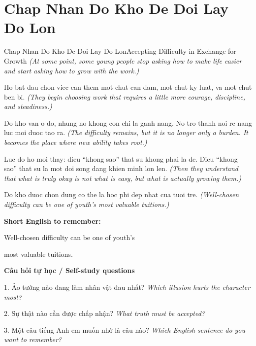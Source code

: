 \section{Chap Nhan Do Kho De Doi Lay Do Lon}
\begin{truyen}{Chap Nhan Do Kho De Doi Lay Do Lon}{Accepting Difficulty in Exchange for Growth}
\textit{(At some point, some young people stop asking how to make life easier and start asking how to grow with the work.)}

Ho bat dau chon viec can them mot chut can dam, mot chut ky luat, va mot chut ben bi.
\textit{(They begin choosing work that requires a little more courage, discipline, and steadiness.)}

Do kho van o do, nhung no khong con chi la ganh nang. No tro thanh noi re nang luc moi duoc tao ra.
\textit{(The difficulty remains, but it is no longer only a burden. It becomes the place where new ability takes root.)}

Luc do ho moi thay: dieu “khong sao” that su khong phai la de. Dieu “khong sao” that su la mot doi song dang khien minh lon len.
\textit{(Then they understand that what is truly okay is not what is easy, but what is actually growing them.)}

\end{truyen}

\begin{baihoc}
Do kho duoc chon dung co the la hoc phi dep nhat cua tuoi tre.
\textit{(Well-chosen difficulty can be one of youth’s most valuable tuitions.)}
\end{baihoc}

\begin{ghinhoanh}
\textbf{Short English to remember:}

Well-chosen difficulty can be one of youth’s

most valuable tuitions.

\end{ghinhoanh}

\begin{tuhocnhanh}
\textbf{Câu hỏi tự học / Self-study questions}

1. Ảo tưởng nào đang làm nhân vật đau nhất? \textit{Which illusion hurts the character most?}

2. Sự thật nào cần được chấp nhận? \textit{What truth must be accepted?}

3. Một câu tiếng Anh em muốn nhớ là câu nào? \textit{Which English sentence do you want to remember?}
\end{tuhocnhanh}
\ngancach

